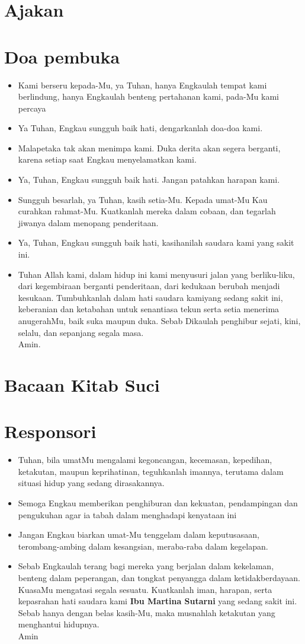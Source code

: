 \documentclass[a4paper,11point]{article}
\newcommand{\BU}[1]{\begin{itemize} \item[U:] #1 \end{itemize}}
\newcommand{\BP}[1]{\begin{itemize} \item[P:] #1 \end{itemize}}
\begin{document}
\section*{Ajakan}
\section*{Doa pembuka}
\BP{Kami berseru kepada-Mu, ya Tuhan, hanya Engkaulah tempat kami berlindung, hanya Engkaulah benteng pertahanan kami, pada-Mu kami percaya}
\BU{Ya Tuhan, Engkau sungguh baik hati, dengarkanlah doa-doa kami.}
\BP{Malapetaka tak akan menimpa kami. Duka derita akan segera berganti, karena setiap saat Engkau menyelamatkan kami.}
\BU{Ya, Tuhan, Engkau sungguh baik hati. Jangan patahkan harapan kami.}
\BP{Sungguh besarlah, ya Tuhan, kasih setia-Mu.  Kepada umat-Mu Kau curahkan rahmat-Mu. Kuatkanlah mereka dalam cobaan, dan tegarlah jiwanya dalam menopang penderitaan.}
\BU{Ya, Tuhan, Engkau sungguh baik hati, kasihanilah saudara kami yang sakit ini.}

\BU{Tuhan Allah kami, dalam hidup ini kami menyusuri jalan yang berliku-liku, dari kegembiraan berganti penderitaan, dari kedukaan berubah menjadi kesukaan. Tumbuhkanlah dalam hati saudara kamiyang sedang sakit ini, keberanian dan ketabahan untuk senantiasa tekun serta setia menerima anugerahMu, baik suka maupun duka. Sebab Dikaulah penghibur sejati, kini, selalu, dan sepanjang segala masa. \\
Amin.}

\section*{Bacaan Kitab Suci}

\section*{Responsori}
\BP{Tuhan, bila umatMu mengalami kegoncangan, kecemasan, kepedihan, ketakutan, maupun keprihatinan, teguhkanlah imannya, terutama dalam situasi hidup yang sedang dirasakannya.}
\BU{Semoga Engkau memberikan penghiburan dan kekuatan, pendampingan dan pengukuhan agar ia tabah dalam menghadapi kenyataan ini}
\BP{Jangan Engkau biarkan umat-Mu tenggelam dalam keputusasaan, terombang-ambing dalam kesangsian, meraba-raba dalam kegelapan.}
\BU{Sebab Engkaulah terang bagi mereka yang berjalan dalam kekelaman, benteng dalam peperangan, dan tongkat penyangga dalam ketidakberdayaan. KuasaMu mengatasi segala sesuatu. Kuatkanlah iman, harapan, serta kepasrahan hati saudara kami \textbf{Ibu Martina Sutarni} yang sedang sakit ini. Sebab hanya dengan belas kasih-Mu, maka musnahlah ketakutan yang menghantui hidupnya.\\
Amin}
\end{document}
